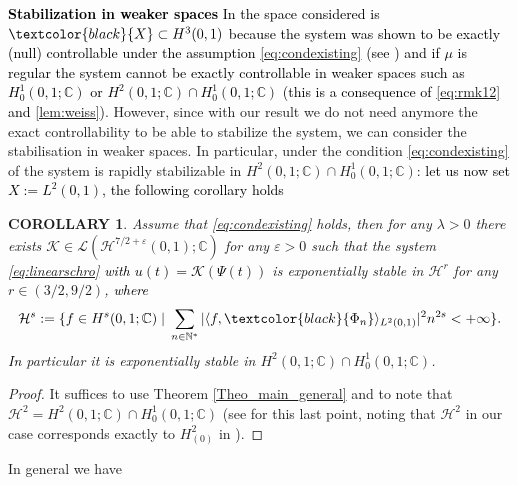 \documentclass[11pt, dvipsnames]{amsart}
\newtheorem{corollary}[theorem]{COROLLARY}
\begin{document}
\textcolor{black}{
\noindent\textbf{Stabilization in weaker spaces} In \cite{Coron2018-rapid,nguyen2024rapid} the space considered is $\textcolor{black}{X}\subset H^{3}(0,1)$ because the system was shown to be exactly (null) controllable  under the assumption \eqref{eq:condexisting} (see \cite{beauchard2010local}) and if $\mu$ is regular the system cannot be exactly controllable in weaker spaces such as $H^{1}_{0}(0,1;\mathbb{C})$ or $H^{2}(0,1;\mathbb{C})\cap H^{1}_{0}(0,1;\mathbb{C})$ (this is a consequence of \eqref{eq:rmk12} and \ref{lem:weiss})}.
However, since with our result we do not need anymore the exact controllability to be able to stabilize the system, we can consider the stabilisation in weaker spaces. In particular, under the condition \eqref{eq:condexisting} of \cite{beauchard2010local,Coron2018-rapid,nguyen2024rapid} the system is rapidly stabilizable in $H^{2}(0,1;\mathbb{C})\cap H^{1}_{0}(0,1;\mathbb{C})$: \textcolor{black}{let us now set $X:= L^{2}(0,1)$, the following corollary holds}
\begin{corollary}
Assume that \eqref{eq:condexisting} holds, then
    for any $\lambda>0$ there exists $\mathcal{K}\in \mathcal{L}(\mathcal{H}^{7/2+\varepsilon}(0,1);\mathbb{C})$ for any $\varepsilon>0$ such that the system \eqref{eq:linearschro} 
    \textcolor{black}{with $u(t)=\mathcal{K}(\Psi(t))$} is exponentially stable in $\mathcal{H}^{r}$ for any $r\in(3/2,9/2)$, \textcolor{black}{where}
        \begin{equation}
        \label{eq:mathcalHsschro}
        \mathcal{H}^{s} :=\{f \in H^{s}(0,1;\mathbb{C})\;|\;\sum\limits_{n\in\mathbb{N}^{*}}|\langle f,\textcolor{black}{\Phi_{n}} \rangle_{L^{2}(0,1)}|^{2}n^{2s}<+\infty\}.
    \end{equation}
     \textcolor{black}{In} particular it is exponentially stable in $H^{2}(0,1;\mathbb{C})\cap H^{1}_{0}(0,1;\mathbb{C})$.
\end{corollary}
\begin{proof}
It suffices to use Theorem \ref{Theo_main_general} and to note that $\mathcal{H}^{2} = H^{2}(0,1;\mathbb{C})\cap H^{1}_{0}(0,1;\mathbb{C})$ (see \cite[Section 1.1]{Coron2018-rapid} for this last point, noting that $\mathcal{H}^{2}$ in our case corresponds exactly to $H_{(0)}^{2}$ in \cite{Coron2018-rapid}).
\end{proof}
In general we have 
\end{document}
